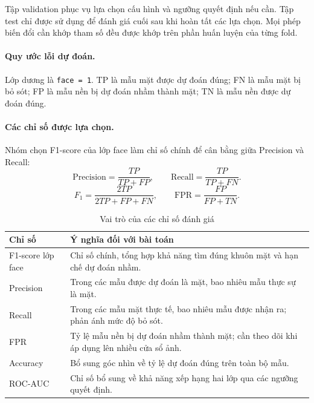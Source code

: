 \documentclass[12pt,a4paper,oneside]{report}
\begin{document}
Tập validation phục vụ lựa chọn cấu hình
và ngưỡng quyết định nếu cần.
Tập test chỉ được sử dụng để đánh giá cuối
sau khi hoàn tất các lựa chọn.
Mọi phép biến đổi cần khớp tham số đều được
khớp trên phần huấn luyện của từng fold.

\paragraph{Quy ước lỗi dự đoán.}

Lớp dương là \texttt{face = 1}.
TP là mẫu mặt được dự đoán đúng;
FN là mẫu mặt bị bỏ sót;
FP là mẫu nền bị dự đoán nhầm thành mặt;
TN là mẫu nền được dự đoán đúng.

\paragraph{Các chỉ số được lựa chọn.}

Nhóm chọn F1-score của lớp face làm chỉ số chính
để cân bằng giữa Precision và Recall:
\[
\mathrm{Precision}=\frac{TP}{TP+FP},
\qquad
\mathrm{Recall}=\frac{TP}{TP+FN}.
\]
\[
F_1=\frac{2TP}{2TP+FP+FN},
\qquad
\mathrm{FPR}=\frac{FP}{FP+TN}.
\]

\begin{table}[H]
    \centering
    \caption{Vai trò của các chỉ số đánh giá}
    \label{tab:lydo_chon_chiso}
    \small
    \begin{tabularx}{\textwidth}{
        >{\raggedright\arraybackslash}p{3cm}
        >{\raggedright\arraybackslash}X}
        \toprule
        \textbf{Chỉ số}
        & \textbf{Ý nghĩa đối với bài toán} \\
        \midrule

        F1-score lớp face
        & Chỉ số chính, tổng hợp khả năng tìm đúng
          khuôn mặt và hạn chế dự đoán nhầm. \\

        Precision
        & Trong các mẫu được dự đoán là mặt,
          bao nhiêu mẫu thực sự là mặt. \\

        Recall
        & Trong các mẫu mặt thực tế,
          bao nhiêu mẫu được nhận ra;
          phản ánh mức độ bỏ sót. \\

        FPR
        & Tỷ lệ mẫu nền bị dự đoán nhầm thành mặt;
          cần theo dõi khi áp dụng lên nhiều cửa sổ ảnh. \\

        Accuracy
        & Bổ sung góc nhìn về tỷ lệ dự đoán đúng
          trên toàn bộ mẫu. \\

        ROC-AUC
        & Chỉ số bổ sung về khả năng xếp hạng
          hai lớp qua các ngưỡng quyết định. \\
        \bottomrule
    \end{tabularx}
\end{table}
\end{document}

